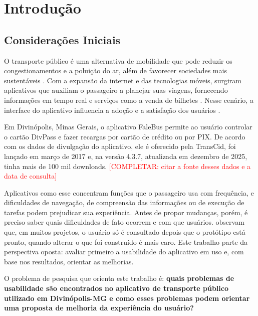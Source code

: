
\chapter[Introdução]{Introdução}\label{capitulo1}

\providecommand{\completar}[1]{\textcolor{red}{[COMPLETAR: #1]}}

\section{Considerações Iniciais}

O transporte público é uma alternativa de mobilidade que pode reduzir os congestionamentos e a poluição do ar, além de favorecer sociedades mais sustentáveis \cite{hussain2017}. Com a expansão da internet e das tecnologias móveis, surgiram aplicativos que auxiliam o passageiro a planejar suas viagens, fornecendo informações em tempo real e serviços como a venda de bilhetes \cite{hussain2017}. Nesse cenário, a interface do aplicativo influencia a adoção e a satisfação dos usuários \cite{suzianti2020}.

Em Divinópolis, Minas Gerais, o aplicativo FaleBus permite ao usuário controlar o cartão DivPass e fazer recargas por cartão de crédito ou por PIX. De acordo com os dados de divulgação do aplicativo, ele é oferecido pela TransCid, foi lançado em março de 2017 e, na versão 4.3.7, atualizada em dezembro de 2025, tinha mais de 100 mil downloads. \completar{citar a fonte desses dados e a data de consulta}

Aplicativos como esse concentram funções que o passageiro usa com frequência, e dificuldades de navegação, de compreensão das informações ou de execução de tarefas podem prejudicar sua experiência. Antes de propor mudanças, porém, é preciso saber quais dificuldades de fato ocorrem e com que usuários.  observam que, em muitos projetos, o usuário só é consultado depois que o protótipo está pronto, quando alterar o que foi construído é mais caro. Este trabalho parte da perspectiva oposta: avaliar primeiro a usabilidade do aplicativo em uso e, com base nos resultados, orientar as melhorias.

O problema de pesquisa que orienta este trabalho é: \textbf{quais problemas de usabilidade são encontrados no aplicativo de transporte público utilizado em Divinópolis-MG e como esses problemas podem orientar uma proposta de melhoria da experiência do usuário?}

